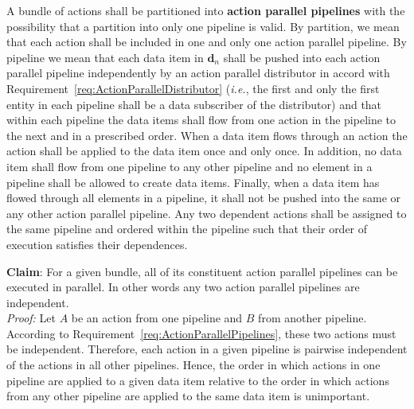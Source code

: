 \documentclass{article}
\newcommand{\ie}{\textit{i.e.}}   %
\begin{document}
\begin{req}
\label{req:ActionParallelPipelines}
A bundle of actions shall be partitioned into \textbf{action parallel pipelines}
with the possibility that a partition into only one pipeline is valid.  By
partition, we mean that each action shall be included in one and only one action
parallel pipeline.  By pipeline we mean that each data item in $\mathbf{d}_n$
shall be pushed into each action parallel pipeline independently by an action
parallel distributor in accord with
Requirement~\ref{req:ActionParallelDistributor} (\ie, the first and only the
first entity in each pipeline shall be a data subscriber of the distributor) and
that within each pipeline the data items shall flow from one action in the
pipeline to the next and in a prescribed order.  When a data item flows through
an action the action shall be applied to the data item once and only once.  In
addition, no data item shall flow from one pipeline to any other pipeline and no
element in a pipeline shall be allowed to create data items.  Finally, when a data
item has flowed through all elements in a pipeline, it shall not be pushed into
the same or any other action parallel pipeline.  Any two dependent actions shall
be assigned to the same pipeline and ordered within the pipeline such that their
order of execution satisfies their dependences.
\end{req}

\textbf{Claim}: For a given bundle, all of its constituent action parallel
pipelines can be executed in parallel.  In other words any two action parallel
pipelines are independent.\\[0.05in]
\textit{Proof:}\hspace{0.125in}  Let $A$ be an action from one pipeline and $B$
from another pipeline.  According to
Requirement~\ref{req:ActionParallelPipelines}, these two actions must be
independent.  Therefore, each action in a given pipeline is pairwise
independent of the actions in all other pipelines.  Hence, the order in which
actions in one pipeline are applied to a given data item relative to the order in which actions
from any other pipeline are applied to the same data item is
unimportant.\\[0.05in]
\end{document}
